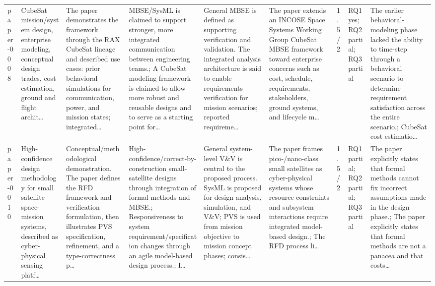 \documentclass[10pt]{article}
\begin{document}
\begin{landscape}
\begin{longtable}{p{1.0cm}p{2.4cm}p{3.1cm}p{3.7cm}p{3.4cm}p{3.1cm}p{1.0cm}p{1.8cm}p{3.4cm}}
paper-0008 & CubeSat mission/system design, enterprise modeling, conceptual design trades, cost estimation, ground and flight archit… & The paper demonstrates the framework through the RAX CubeSat lineage and described use cases: prior behavioral simulations for communication, power, and mission states; integrated… & MBSE/SysML is claimed to support stronger, more integrated communication between engineering teams.; A CubeSat modeling framework is claimed to allow more robust and reusable designs and to serve as a starting point for… & General MBSE is defined as supporting verification and validation. The integrated analysis architecture is said to enable requirements verification for mission scenarios; reported requireme… & The paper extends an INCOSE Space Systems Working Group CubeSat MBSE framework toward enterprise concerns such as cost, schedule, requirements, stakeholders, ground systems, and lifecycle m… & 1.5/2 & RQ1 yes; RQ2 partial; RQ3 partial & The earlier behavioral-modeling phase lacked the ability to time-step through a behavioral scenario to determine requirement satisfaction across the entire scenario.; CubeSat cost estimatio… \\
paper-0010 & High-confidence design methodology for small satellite space-mission systems, described as cyber-physical sensing platf… & Conceptual/methodological demonstration. The paper defines the RFD framework and verification formulation, then illustrates PVS specification, refinement, and a type-correctness p… & High-confidence/correct-by-construction small-satellite designs through integration of formal methods and MBSE.; Responsiveness to system requirement/specification changes through an agile model-based design process.; I… & General system-level V\&V is central to the proposed process. SysML is proposed for design analysis, simulation, and V\&V; PVS is used from mission objective to mission concept phases; consis… & The paper frames pico-/nano-class small satellites as cyber-physical systems whose resource constraints and subsystem interactions require integrated model-based design.; The RFD process li… & 1.5/2 & RQ1 partial; RQ2 partial; RQ3 partial & The paper explicitly states that formal methods cannot fix incorrect assumptions made in the design phase.; The paper explicitly states that formal methods are not a panacea and that costs… \\

\end{longtable}
\end{landscape}
\end{document}
